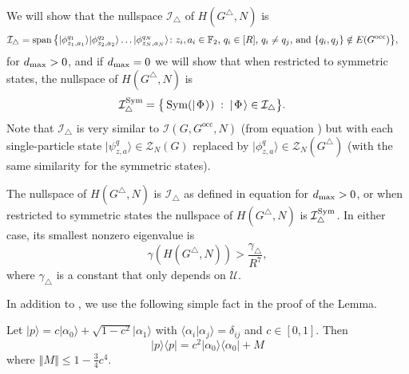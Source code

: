 \documentclass[../thesis-main/thesis-main]{subfiles}
\begin{document}
We will show that the nullspace $\mathcal{I}_{\triangle}$ of $H(G^{\triangle},N)$ is 
\begin{align}
  \mathcal{I}_{\triangle}&=\operatorname{span}\big\{|\phi_{z_{1},a_{1}}^{q_{1}}\rangle|\phi_{z_{2},a_{2}}^{q_{2}}\rangle\ldots|\phi_{z_{N},a_{N}}^{q_{N}}\rangle\colon
\text{$z_{i},a_{i}\in\mathbb{F}_2$, $q_{i}\in[R]$, $q_{i}\neq q_{j}$, and $\{q_{i},q_{j}\}\notin E(G^{\text{occ}})$}\big\},
\label{eq:I_triangle}
\end{align}
for $d_{\text{max}} > 0$, and if $d_{\text{max}} = 0$ we will show that when restricted to symmetric states, the nullspace of $H(G^{\triangle},N)$ is 
\begin{align}
  \mathcal{I}_{\triangle}^{\operatorname{Sym}} &=  \big\{ \operatorname{Sym} ( |\mspace{2mu} \Phi \mspace{2mu} \rangle) \; : \; |\mspace{2mu} \Phi \mspace{2mu} \rangle \in \mathcal{I}_{\triangle}\big\}.
\end{align}
Note that $\mathcal{I}_{\triangle}$ is very similar to $\mathcal{I}(G,G^{\text{occ}},N)$ (from equation ) but with each single-particle state $|\psi_{z,a}^{q}\rangle\in\mathcal{Z}_{N}(G)$ replaced by $|\phi_{z,a}^{q}\rangle\in\mathcal{Z}_{N}(G^{\triangle})$ (with the same similarity for the symmetric states).


\begin{lemma}
\label{lem:The-nullspace-of_H_triangle}The nullspace of $H(G^{\triangle},N)$ is $\mathcal{I}_{\triangle}$ as defined in equation  for $d_{\text{max}} >0$, or when restricted to symmetric states the nullspace of $H(G^\triangle,N)$ is $\mathcal{I}_\triangle^{\operatorname{Sym}}$. In either case, its smallest nonzero eigenvalue is 
\begin{equation}
\gamma(H(G^{\triangle},N)) > \frac{\gamma_{\triangle}}{R^{7}},\label{eq:lowerbound_HG_triangle}
\end{equation}
where $\gamma_{\triangle}$ is a constant that only depends on $\mathcal{U}$.
\end{lemma}

In addition to , we use the following simple fact in the proof of the Lemma.

\begin{fact}
\label{fct:lin_alg_fact}
Let $|p\rangle=c|\alpha_{0}\rangle+\sqrt{1-c^{2}}|\alpha_{1}\rangle$ with $\langle\alpha_{i}|\alpha_{j}\rangle=\delta_{ij}$ and $c\in[0,1]$. Then
\begin{equation}
|p\rangle\langle p|=c^{2}|\alpha_{0}\rangle\langle\alpha_{0}|+M
\end{equation}
where $\left\Vert M\right\Vert \leq1-\frac{3}{4}c^{4}$.
\end{fact}
\end{document}
